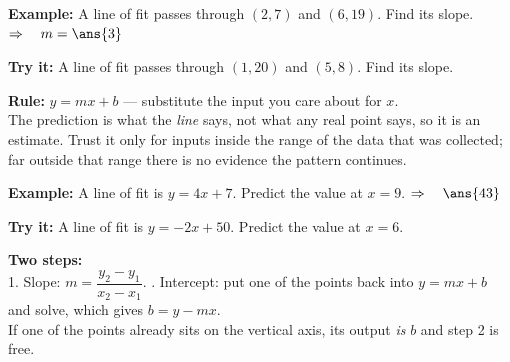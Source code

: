 \documentclass[12pt]{article}
\begin{document}
\begin{examplebox}
\textbf{Example:} \quad A line of fit passes through $(2, 7)$ and $(6, 19)$. Find its slope.
$\Rightarrow\quad m = \ans{3}$
\end{examplebox}

\begin{tryitbox}
\textbf{Try it:} \quad A line of fit passes through $(1, 20)$ and $(5, 8)$. Find its slope.\\[2pt]
\end{tryitbox}


\begin{formulabox}
\textbf{Rule:} \quad $y = mx + b$ --- substitute the input you care about for $x$.\\[3pt]
The prediction is what the \textit{line} says, not what any real point says, so it is an estimate.
Trust it only for inputs inside the range of the data that was collected; far outside that range
there is no evidence the pattern continues.
\end{formulabox}

\begin{examplebox}
\textbf{Example:} \quad A line of fit is $y = 4x + 7$. Predict the value at $x = 9$.
$\Rightarrow\quad \ans{43}$
\end{examplebox}

\begin{tryitbox}
\textbf{Try it:} \quad A line of fit is $y = -2x + 50$. Predict the value at $x = 6$.\\[2pt]
\end{tryitbox}


\begin{formulabox}
\textbf{Two steps:}\\[3pt]
1. Slope: $m = \dfrac{y_2 - y_1}{x_2 - x_1}$. . Intercept: put one of the points back into
$y = mx + b$ and solve, which gives $b = y - mx$.\\[3pt]
If one of the points already sits on the vertical axis, its output \textit{is} $b$ and step 2 is
free.
\end{formulabox}
\end{document}
